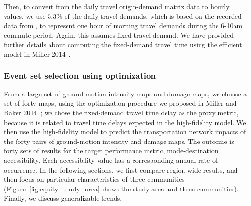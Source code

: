 Then, to convert from the daily travel origin-demand matrix data to hourly values, we use 5.3\% of the daily travel demands, which is based on the recorded data from \cite{wang_understanding_2012}, to represent one hour of morning travel demands during the 6-10am commute period. Again, this assumes fixed travel demand. We have provided further details about computing the fixed-demand travel time using the efficient model in Miller 2014~\cite{miller_seismic_2014}.
%


\subsubsection{Event set selection using optimization}
From a large set of ground-motion intensity maps and damage maps, we choose a set of forty maps, using the optimization procedure we proposed in Miller and Baker 2014~\cite{miller_ground-motion_2014}; we chose the fixed-demand travel time delay as the proxy metric, because it is related to travel time delays expected in the high-fidelity model. We then use the high-fidelity model to predict the transportation network impacts of the forty pairs of ground-motion intensity and damage maps. The outcome is forty sets of results for the target performance metric, mode-destination accessibility. Each accessibility value has a corresponding annual rate of occurrence.
In the following sections, we first compare region-wide results, and then focus on particular characteristics of three communities (Figure~\ref{fig:equity_study_area} shows the study area and three communities). Finally, we discuss generalizable trends.
